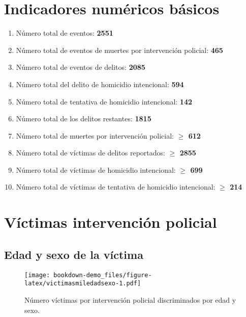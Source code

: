 \documentclass[
]{book}
\begin{document}
\hypertarget{indicadores-numuxe9ricos-buxe1sicos}{%
\chapter{Indicadores numéricos básicos}\label{indicadores-numuxe9ricos-buxe1sicos}}

\begin{enumerate}
\def\labelenumi{\alph{enumi}.}
\item
  Número total de eventos: \textbf{2551}
\item
  Número total de eventos de muertes por intervención policial: \textbf{465}
\item
  Número total de eventos de delitos: \textbf{2085}
\item
  Número total del delito de homicidio intencional: \textbf{594}
\item
  Número total de tentativa de homicidio intencional: \textbf{142}
\item
  Número total de los delitos restantes: \textbf{1815}
\item
  Número total de muertes por intervención policial: \textbf{\(\ge\) 612}
\item
  Número total de víctimas de delitos reportados: \textbf{\(\ge\) 2855}
\item
  Número total de víctimas de homicidio intencional: \textbf{\(\ge\) 699}
\item
  Número total de víctimas de tentativa de homicidio intencional: \textbf{\(\ge\) 214}
\end{enumerate}

\hypertarget{vuxedctimas-intervenciuxf3n-policial}{%
\chapter{Víctimas intervención policial}\label{vuxedctimas-intervenciuxf3n-policial}}

\hypertarget{edad-y-sexo-de-la-vuxedctima}{%
\section{Edad y sexo de la víctima}\label{edad-y-sexo-de-la-vuxedctima}}



\begin{figure}
\centering
\texttt{[image: bookdown-demo\_files/figure-latex/victimasmiledadsexo-1.pdf]}
\caption{\label{fig:victimasmiledadsexo}Número víctimas por intervención policial discriminados por edad y sexo.}
\end{figure}
\end{document}
